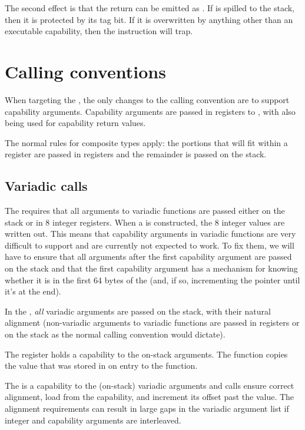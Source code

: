 The second effect is that the return can be emitted as .%
If  is spilled to the stack, then it is protected by its tag bit.
If it is overwritten by anything other than an executable capability, then the  instruction will trap.

\section{Calling conventions}

When targeting the \mipsABI{}, the only changes to the calling convention are to support capability arguments.
Capability arguments are passed in registers  to , with  also being used for capability return values.

The normal rules for composite types apply: the portions that will fit within a register are passed in registers and the remainder is passed on the stack.

\subsection{Variadic calls}

The \mipsABI{} requires that all arguments to variadic functions are passed either on the stack or in 8 integer registers.
When a  is constructed, the 8 integer values are written out.
This means that capability arguments in variadic functions are very difficult to support and are currently not expected to work.
To fix them, we will have to ensure that all arguments after the first capability argument are passed on the stack and that the first capability argument has a mechanism for knowing whether it is in the first 64 bytes of the  (and, if so, incrementing the pointer until it's at the end).

In the \purecapABI{}, \textit{all} variadic arguments are passed on the stack, with their natural alignment (non-variadic arguments to variadic functions are passed in registers or on the stack as the normal calling convention would dictate).

The  register holds a capability to the on-stack arguments.
The  function copies the value that was stored in  on entry to the function.

The  is a capability to the (on-stack) variadic arguments and  calls ensure correct alignment, load from the capability, and increment its offset past the value.
The alignment requirements can result in large gaps in the variadic argument list if integer and capability arguments are interleaved.

